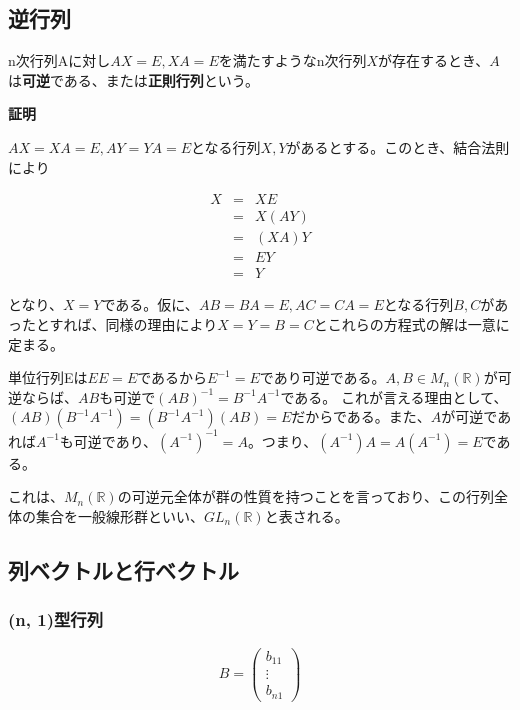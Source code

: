 \documentclass[dvipdfmx,autodetect-engine]{jsarticle}
\begin{document}
\subsection{逆行列}

n次行列Aに対し$AX = E, XA = E$を満たすようなn次行列$X$が存在するとき、$A$は{\bf 可逆}である、または{\bf 正則行列}という。


{\bf 証明}

$AX = XA = E, AY = YA = E$となる行列$X, Y$があるとする。このとき、結合法則により

\begin{eqnarray*}
X &= &XE \\
  &= &X(AY) \\
  &= &(XA)Y \\
  &= &EY \\
  &= &Y
\end{eqnarray*}

となり、$X = Y$である。仮に、$AB = BA = E, AC = CA = E$となる行列$B, C$があったとすれば、同様の理由により$X = Y = B = C$とこれらの方程式の解は一意に定まる。


単位行列Eは$EE = E$であるから$E^{-1} = E$であり可逆である。$A, B \in M_n(\mathbb{R})$が可逆ならば、$AB$も可逆で$(AB)^{-1} = B^{-1}A^{-1}$である。
これが言える理由として、$(AB)(B^{-1}A^{-1}) = (B^{-1}A^{-1})(AB) = E$だからである。また、$A$が可逆であれば$A^{-1}$も可逆であり、$(A^{-1})^{-1} = A$。つまり、$(A^{-1})A = A(A^{-1}) = E$である。

これは、$M_n(\mathbb{R})$の可逆元全体が群の性質を持つことを言っており、この行列全体の集合を一般線形群といい、$GL_n(\mathbb{R})$と表される。

\subsection{列ベクトルと行ベクトル}

\subsubsection{(n, 1)型行列}

$$
B = \begin{pmatrix}
b_{11} \\
\vdots \\
b_{n1}
\end{pmatrix}
$$
\end{document}
